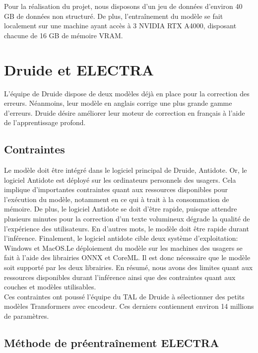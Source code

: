 \documentclass[12pt,twoside,maitrise]{dms}
\theoremstyle{definition}
\numberwithin{equation}{section}
\numberwithin{table}{chapter}
\numberwithin{figure}{chapter}
\begin{document}
Pour la réalisation du projet, nous disposons d'un jeu de données d'environ 40
GB de données non structuré. De plus, l'entraînement du modèle se fait
localement sur une machine ayant accès à 3 NVIDIA RTX A4000, disposant chacune
de 16 GB de mémoire VRAM.



\chapter{Druide et ELECTRA}
L'équipe de Druide dispose de deux modèles déjà en place pour la correction des
erreurs. Néanmoins, leur modèle en anglais corrige une plus grande gamme
d'erreurs. Druide désire améliorer leur moteur de correction en français à
l'aide de l'apprentissage profond. %

\section{Contraintes}
Le modèle doit être intégré dans le logiciel principal de Druide, Antidote. Or,
le logiciel Antidote est déployé sur les ordinateurs personnels des usagers.
Cela implique d'importantes contraintes quant aux ressources disponibles pour
l'exécution du modèle, notamment en ce qui à trait à la consommation de
mémoire. De plus, le logiciel Antidote se doit d'être rapide, puisque attendre
plusieurs minutes pour la correction d'un texte volumineux dégrade la qualité
de l'expérience des utilisateurs. En d'autres mots, le modèle doit être rapide
durant l'inférence. Finalement, le logiciel antidote cible deux système
d'exploitation: Windows et MacOS.\@ Le déploiement du modèle sur les machines
des usagers se fait à l'aide des librairies ONNX\cite{onnxruntime} et CoreML.\@
Il est donc nécessaire que le modèle soit supporté par les deux librairies.
En résumé, nous avons des limites quant aux ressources disponibles durant
l'inférence ainsi que des contraintes quant aux couches et modèles utilisables.\\

Ces contraintes ont poussé l'équipe du TAL de Druide à sélectionner
des petits modèles Transformers\cite{vaswani2023attentionneed} avec
encodeur. Ces derniers contiennent environ 14 millions de paramètres.

\section{Méthode de préentraînement ELECTRA}
\end{document}
